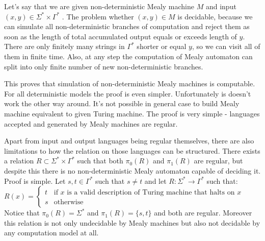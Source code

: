 \documentclass[12pt]{article}
\begin{document}
Let's say that we are given non-deterministic Mealy machine $M$ and input $(x,y) \in \Sigma^* \times \Gamma^*$ . The problem whether $(x,y) \in M$ is decidable, because we can simulate all non-deterministic branches of computation and reject them as soon as the length of total accumulated output equals or exceeds length of $y$. There are only finitely many strings in $\Gamma^*$ shorter or equal $y$, so we can visit all of them in finite time. Also, at any step the computation of Mealy automaton can split into only finite number of new non-deterministic branches. 

This proves that simulation of non-deterministic Mealy machines is computable. For all deterministic models the proof is even simpler. Unfortunately is doesn't work the other way around. It's not possible in general case to build Mealy machine equivalent to given Turing machine. The proof is very simple - languages accepted and generated by Mealy machines are regular. 

Apart from input and output languages being regular themselves, there are also limitations to how the relation on those languages can be structured. There exists a relation $ R \subset \Sigma^* \times \Gamma^*$
such that both $\pi_0(R)$ and $\pi_1(R)$ are regular, but despite this there is no non-deterministic Mealy automaton capable of deciding it. Proof is simple. Let $s,t\in \Gamma^*$ such that $s\ne t$ and let $R:\Sigma^* \rightarrow \Gamma^*$ such that: \\
$R(x) = \begin{cases}
t & \mbox{if }  x  \mbox{ is a valid description of Turing machine that halts on } x   \\
s & \mbox{otherwise} 
\end{cases}$ \\
Notice that $\pi_0(R) = \Sigma^*$ and $\pi_1(R) = \{s,t\}$ and both are regular. Moreover this relation is not only undecidable by Mealy machines but also not decidable by any computation model at all.
\end{document}
